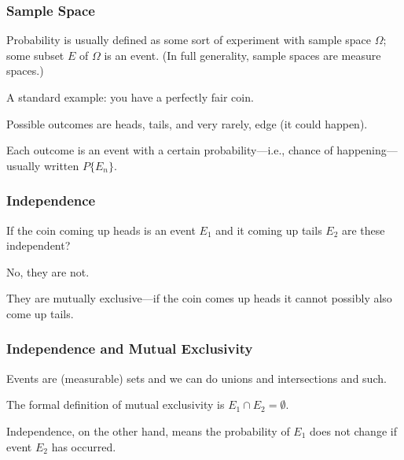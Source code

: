 \begin{frame}
\frametitle{Sample Space}

Probability is usually defined as some sort of experiment with sample space $\Omega$; some subset $E$ of $\Omega$ is an \alert{event}. (In full generality, sample spaces are measure spaces.)

A standard example: you have a perfectly fair coin. 

Possible outcomes are heads, tails, and very rarely, edge (it could happen). 

Each outcome is an event with a certain probability---i.e., chance of happening---usually written $P\{E_{n}\}$.


\end{frame}



\begin{frame}
\frametitle{Independence}

If the coin coming up heads is an event $E_{1}$ and it coming up tails $E_{2}$ are these independent? 

No, they are not. 

They are mutually exclusive---if the coin comes up heads it cannot possibly also come up tails. 


\end{frame}



\begin{frame}
\frametitle{Independence and Mutual Exclusivity}

Events are (measurable) sets and we can do unions and intersections and such. 

The formal definition of mutual exclusivity is $E_{1} \cap E_{2} = \emptyset$. 

Independence, on the other hand, means the probability of $E_{1}$ does not change if event $E_{2}$ has occurred.


\end{frame}




